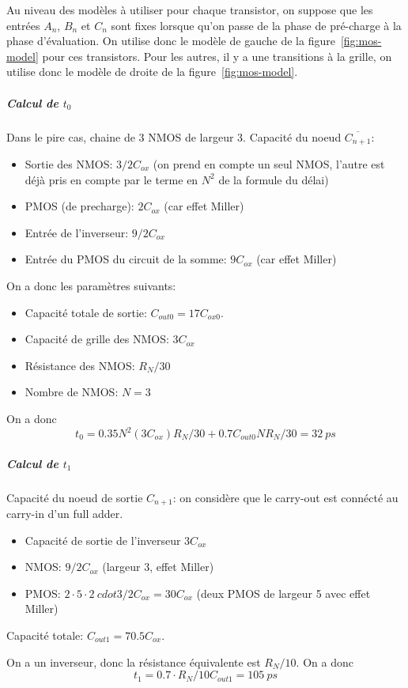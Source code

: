 \documentclass[frenchb,DIV=14]{scrartcl}
\begin{document}
Au niveau des modèles à utiliser pour chaque transistor, on suppose que les
entrées $A_n$, $B_n$ et $C_n$ sont fixes lorsque qu'on passe de la phase de
pré-charge à la phase d'évaluation. On utilise donc le modèle de gauche de la
figure~\ref{fig:mos-model} pour ces transistors. Pour les autres, il y a une
transitions à la grille, on utilise donc le modèle de droite de la figure~\ref{fig:mos-model}. 

\subparagraph{Calcul de $t_0$}
Dans le pire cas, chaine de 3 NMOS de largeur 3.
Capacité du noeud $\overline{C_{n+1}}$:
\begin{itemize}
    \item Sortie des NMOS: $3/2 C_{ox}$ (on prend en compte un seul NMOS, l'autre est
    déjà pris en compte par le terme en $N^2$ de la formule du délai)
    \item PMOS (de precharge): $2C_{ox}$ (car effet Miller)
    \item Entrée de l'inverseur: $9/2 C_{ox}$
    \item Entrée du PMOS du circuit de la somme: $9 C_{ox}$ (car effet Miller)
\end{itemize}

On a donc les paramètres suivants:
\begin{itemize}
    \item Capacité totale de sortie: $C_{out0} = 17 C_{ox0}$.
    \item Capacité de grille des NMOS: $3C_{ox}$
    \item Résistance des NMOS: $R_N/30$
    \item Nombre de NMOS: $N = 3$
\end{itemize}

On a donc
\[t_0 = 0.35 N^2 (3C_{ox}) R_N/30 + 0.7 C_{out0} N R_N/30 = \SI{32}{ps}\]

\subparagraph{Calcul de $t_1$}
Capacité du noeud de sortie $C_{n+1}$: on considère que le carry-out est
connécté au carry-in d'un full adder.
\begin{itemize}
\item Capacité de sortie de l'inverseur $3C_{ox}$
\item NMOS: $9/2 C_{ox}$ (largeur 3, effet Miller)
\item PMOS: $2\cdot 5 \cdot 2 \ cdot 3/2 C_{ox} = 30 C_{ox}$ (deux PMOS de largeur 5 avec effet Miller)
\end{itemize}
Capacité totale: $C_{out1} = 70.5 C_{ox}$.

On a un inverseur, donc la résistance équivalente est $R_N/10$. On a donc
\[t_1 = 0.7 \cdot R_N/10 C_{out1} = \SI{105}{ps}\]
\end{document}
